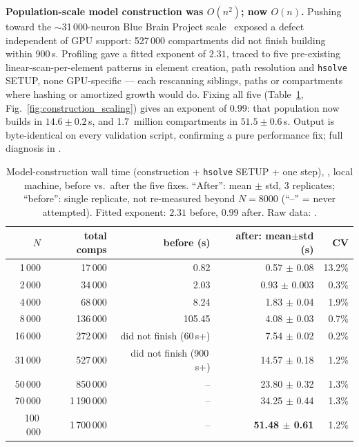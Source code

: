 \documentclass[preprint,12pt, a4paper]{elsarticle}
\begin{document}
\begin{enumerate}
\textbf{Population-scale model construction was $O(n^2)$; now $O(n)$.} Pushing toward the $\sim$31\,000-neuron Blue Brain Project scale~\cite{markram2015reconstruction} exposed a defect independent of GPU support: 527\,000 compartments did not finish building within 900\,s. Profiling gave a fitted exponent of $2.31$, traced to five pre-existing linear-scan-per-element patterns in element creation, path resolution and \texttt{hsolve} SETUP, none GPU-specific --- each rescanning siblings, paths or compartments where hashing or amortized growth would do. Fixing all five (Table~\ref{tab:construction_scaling}, Fig.~\ref{fig:construction_scaling}) gives an exponent of $0.99$: that population now builds in $14.6\pm0.2$\,s, and 1.7~million compartments in $51.5\pm0.6$\,s. Output is byte-identical on every validation script, confirming a pure performance fix; full diagnosis in .

\begin{table}[!h]
\centering
\small
\begin{tabular}{|r|r|r|r|r|}
\hline
\textbf{$N$} & \textbf{total comps} & \textbf{before (s)} & \textbf{after: mean$\pm$std (s)} & \textbf{CV} \\
\hline
1\,000   & 17\,000    & 0.82    & 0.57 $\pm$ 0.08  & 13.2\% \\
\hline
2\,000   & 34\,000    & 2.03    & 0.93 $\pm$ 0.003 & 0.3\% \\
\hline
4\,000   & 68\,000    & 8.24    & 1.83 $\pm$ 0.04  & 1.9\% \\
\hline
8\,000   & 136\,000   & 105.45  & 4.08 $\pm$ 0.03  & 0.7\% \\
\hline
16\,000  & 272\,000   & did not finish (60\,s+)  & 7.54 $\pm$ 0.02  & 0.2\% \\
\hline
31\,000  & 527\,000   & did not finish (900\,s+) & 14.57 $\pm$ 0.18 & 1.2\% \\
\hline
50\,000  & 850\,000   & --                       & 23.80 $\pm$ 0.32 & 1.3\% \\
\hline
70\,000  & 1\,190\,000 & --                      & 34.25 $\pm$ 0.44 & 1.3\% \\
\hline
100\,000 & 1\,700\,000 & --                      & \textbf{51.48 $\pm$ 0.61} & 1.2\% \\
\hline
\end{tabular}
\caption{Model-construction wall time (construction + \texttt{hsolve} SETUP + one step), \protect{}, local machine, before vs.\ after the five fixes. ``After'': mean $\pm$ std, 3 replicates; ``before'': single replicate, not re-measured beyond $N=8000$ (``--'' = never attempted). Fitted exponent: $2.31$ before, $0.99$ after. Raw data: \protect{}.}
\label{tab:construction_scaling}
\end{table}


\end{enumerate}
\end{document}
